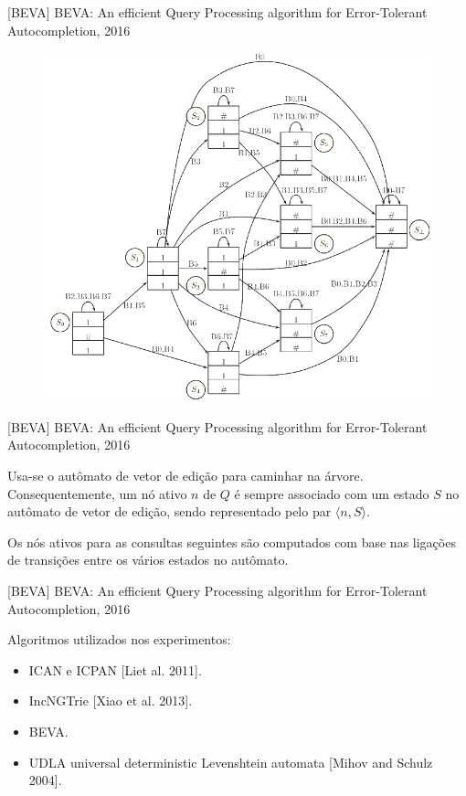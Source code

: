 \documentclass[11pt]{beamer}
\begin{document}
\begin{frame}{[BEVA] BEVA: An efficient Query Processing algorithm for Error-Tolerant Autocompletion, 2016 \cite{BEVA}}

    \begin{figure}
      \includegraphics[scale=0.33]{pictures/edit_vector_automata_beva.png}
      \centering
    \end{figure}
   
\end{frame}

\begin{frame}{[BEVA] BEVA: An efficient Query Processing algorithm for Error-Tolerant Autocompletion, 2016}

    Usa-se o autômato de vetor de edição para caminhar na árvore. Consequentemente, um nó ativo $n$ de $Q$ é sempre associado com um estado $S$ no autômato de vetor de edição, sendo representado pelo par $\langle n, S \rangle$.
    
    Os nós ativos para as consultas seguintes são computados com base nas ligações de transições entre os vários estados no autômato.
   
\end{frame}

\begin{frame}{[BEVA] BEVA: An efficient Query Processing algorithm for Error-Tolerant Autocompletion, 2016}

    Algoritmos utilizados nos experimentos:
    
    \begin{itemize}
        \item ICAN e ICPAN [Liet al. 2011].
        \item IncNGTrie [Xiao et al. 2013].
        \item BEVA.
        \item UDLA universal deterministic Levenshtein automata [Mihov and Schulz 2004].
    \end{itemize}
   
\end{frame}
\end{document}
